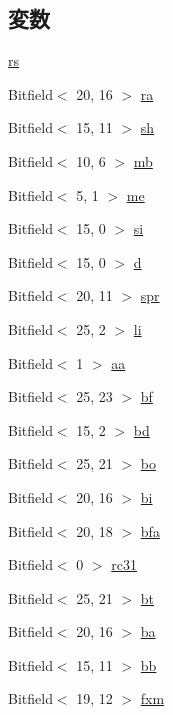 \subsection*{変数}
\begin{DoxyCompactItemize}
\item 
\hyperlink{namespacePowerISA_ab6ffbb9e1859687ca71ea09405ea7e77}{rs}
\item 
Bitfield$<$ 20, 16 $>$ \hyperlink{namespacePowerISA_acd61c92c3a3da2c22ed0c02f761bff4c}{ra}
\item 
Bitfield$<$ 15, 11 $>$ \hyperlink{namespacePowerISA_aba715e510f17915b763e6187cebb715c}{sh}
\item 
Bitfield$<$ 10, 6 $>$ \hyperlink{namespacePowerISA_af1cfa6deda12f905cf835ed3c3f1adae}{mb}
\item 
Bitfield$<$ 5, 1 $>$ \hyperlink{namespacePowerISA_a1e61430dd10c247a98518b5cc3cf70e8}{me}
\item 
Bitfield$<$ 15, 0 $>$ \hyperlink{namespacePowerISA_aadcb0bf111dd32fa1c01c2b82f83c3c3}{si}
\item 
Bitfield$<$ 15, 0 $>$ \hyperlink{namespacePowerISA_a9c78bbf619c2a1c3904cb87c27f375ba}{d}
\item 
Bitfield$<$ 20, 11 $>$ \hyperlink{namespacePowerISA_a347d4d235ec00df8a50bfbf335fcf886}{spr}
\item 
Bitfield$<$ 25, 2 $>$ \hyperlink{namespacePowerISA_a7792690f85ba1d3e3f23ad42037ddf16}{li}
\item 
Bitfield$<$ 1 $>$ \hyperlink{namespacePowerISA_afdb8c8e920e19600c731ae3a2a20a4b2}{aa}
\item 
Bitfield$<$ 25, 23 $>$ \hyperlink{namespacePowerISA_ae5bcb1e163a6022898529ca80fc745ef}{bf}
\item 
Bitfield$<$ 15, 2 $>$ \hyperlink{namespacePowerISA_a7998526ecdc8ded219e2078e67a6c3e5}{bd}
\item 
Bitfield$<$ 25, 21 $>$ \hyperlink{namespacePowerISA_a3b4fd160410ed28184c730d83b3799c8}{bo}
\item 
Bitfield$<$ 20, 16 $>$ \hyperlink{namespacePowerISA_a343aa64358b3471366288f5a0fa62fdf}{bi}
\item 
Bitfield$<$ 20, 18 $>$ \hyperlink{namespacePowerISA_a5e90480067c558846fc7ae7b4c845315}{bfa}
\item 
Bitfield$<$ 0 $>$ \hyperlink{namespacePowerISA_aeb22fe34e1953dcc0a4cb5f2ea1dee6a}{rc31}
\item 
Bitfield$<$ 25, 21 $>$ \hyperlink{namespacePowerISA_af20c9a0d3fd487150d22bafc9725cc46}{bt}
\item 
Bitfield$<$ 20, 16 $>$ \hyperlink{namespacePowerISA_a393572fe9db9b5a8a1b37be8767a3b1d}{ba}
\item 
Bitfield$<$ 15, 11 $>$ \hyperlink{namespacePowerISA_a785dc68b728d07f223e417e322826285}{bb}
\item 
Bitfield$<$ 19, 12 $>$ \hyperlink{namespacePowerISA_ab4e16105ce8c4586d3541781be8e35db}{fxm}
\end{DoxyCompactItemize}
